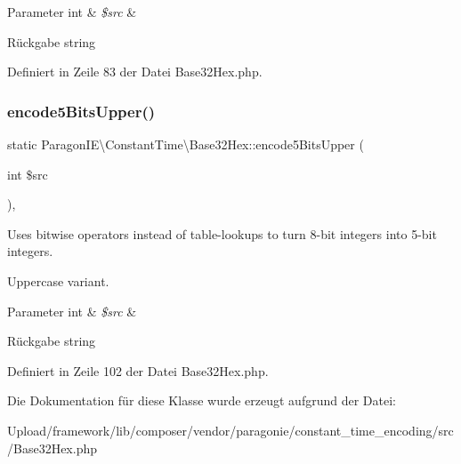 \begin{DoxyParams}[1]{Parameter}
int & {\em \$src} & \\
\hline
\end{DoxyParams}
\begin{DoxyReturn}{Rückgabe}
string 
\end{DoxyReturn}


Definiert in Zeile 83 der Datei Base32\+Hex.\+php.

\mbox{\label{class_paragon_i_e_1_1_constant_time_1_1_base32_hex_a2672daaf226ae7324e38d0faa7058f3c}} 
\subsubsection{\texorpdfstring{encode5\+Bits\+Upper()}{encode5BitsUpper()}}
{\footnotesize\ttfamily static Paragon\+I\+E\textbackslash{}\+Constant\+Time\textbackslash{}\+Base32\+Hex\+::encode5\+Bits\+Upper (\begin{DoxyParamCaption}\item[{int}]{\$src }\end{DoxyParamCaption})\hspace{0.3cm}{\ttfamily [static]}, {\ttfamily [protected]}}

Uses bitwise operators instead of table-\/lookups to turn 8-\/bit integers into 5-\/bit integers.

Uppercase variant.


\begin{DoxyParams}[1]{Parameter}
int & {\em \$src} & \\
\hline
\end{DoxyParams}
\begin{DoxyReturn}{Rückgabe}
string 
\end{DoxyReturn}


Definiert in Zeile 102 der Datei Base32\+Hex.\+php.



Die Dokumentation für diese Klasse wurde erzeugt aufgrund der Datei\+:\begin{DoxyCompactItemize}
\item 
Upload/framework/lib/composer/vendor/paragonie/constant\+\_\+time\+\_\+encoding/src/Base32\+Hex.\+php\end{DoxyCompactItemize}
